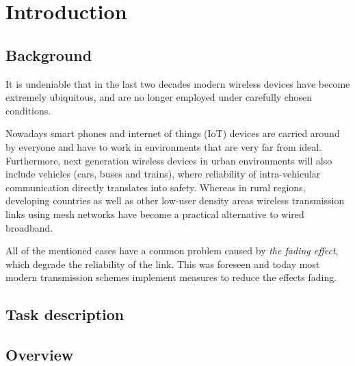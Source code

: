 
\chapter{Introduction}

\section{Background}

It is undeniable that in the last two decades modern wireless devices have become extremely ubiquitous, and are no longer employed under carefully chosen conditions.

Nowadays smart phones and internet of things (IoT) devices are carried around by everyone and have to work in environments that are very far from ideal. Furthermore, next generation wireless devices in urban environments will also include vehicles (cars, buses and trains)\cite{AntonescuTB17}, where reliability of intra-vehicular communication directly translates into safety. Whereas in rural regions, developing countries as well as other low-user density areas wireless transmission links using mesh networks have become a practical alternative to wired broadband\cite{Macmillan2019tidal,Subramanian2006rethinking,Flickenger2007wireless}.

All of the mentioned cases have a common problem caused by \emph{the fading effect}, which degrade the reliability of the link\cite{Mathis}. This was foreseen\cite{Frederiksen2002overview,Maddocks1993introduction} and today most modern transmission schemes implement measures to reduce the effects fading\cite{Mathis,Hsu}.

\section{Task description}



\section{Overview}
